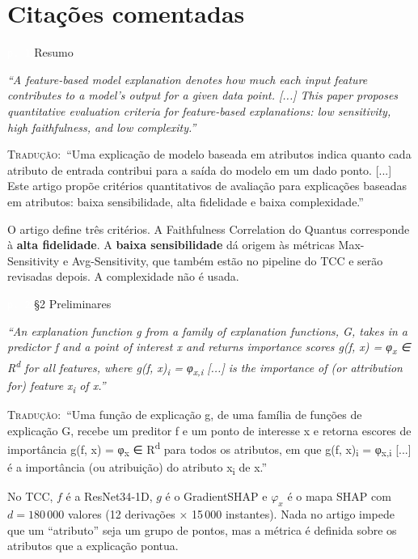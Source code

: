 \documentclass[11pt,a4paper]{article}
\newcommand{\pagechip}[1]{{\setlength{\fboxsep}{1.5pt}\colorbox{cAcc}{\textcolor{white}{\scriptsize\texttt{#1}}}}}
\newenvironment{origquote}{\par\itshape\small}{\par}
\newenvironment{tradquote}{\par\small\textsc{Tradução:}\ }{\par}
\newcommand{\explab}[1]{\par\smallskip{\small\color{cAcc}\textbf{\MakeUppercase{#1}}}\par}
\begin{document}
\section{Citações comentadas}

\begin{citacard}{\pagechip{p. 1} Resumo}
\begin{origquote}“A feature-based model explanation denotes how much each input feature contributes to a model’s output for a given data point. [...] This paper proposes quantitative evaluation criteria for feature-based explanations: low sensitivity, high faithfulness, and low complexity.”\end{origquote}
\begin{tradquote}“Uma explicação de modelo baseada em atributos indica quanto cada atributo de entrada contribui para a saída do modelo em um dado ponto. [...] Este artigo propõe critérios quantitativos de avaliação para explicações baseadas em atributos: baixa sensibilidade, alta fidelidade e baixa complexidade.”\end{tradquote}
\explab{Explicação}
O artigo define três critérios. A Faithfulness Correlation do Quantus corresponde à \textbf{alta fidelidade}. A \textbf{baixa sensibilidade} dá origem às métricas Max-Sensitivity e Avg-Sensitivity, que também estão no pipeline do TCC e serão revisadas depois. A complexidade não é usada.
\end{citacard}

\begin{citacard}{\pagechip{p. 2} §2 Preliminares}
\begin{origquote}“An explanation function g from a family of explanation functions, G, takes in a predictor f and a point of interest x and returns importance scores g(f, x) = φ\textsubscript{x} ∈ R\textsuperscript{d} for all features, where g(f, x)\textsubscript{i} = φ\textsubscript{x,i} [...] is the importance of (or attribution for) feature x\textsubscript{i} of x.”\end{origquote}
\begin{tradquote}“Uma função de explicação g, de uma família de funções de explicação G, recebe um preditor f e um ponto de interesse x e retorna escores de importância g(f, x) = φ\textsubscript{x} ∈ R\textsuperscript{d} para todos os atributos, em que g(f, x)\textsubscript{i} = φ\textsubscript{x,i} [...] é a importância (ou atribuição) do atributo x\textsubscript{i} de x.”\end{tradquote}
\explab{Explicação}
No TCC, $f$ é a ResNet34‑1D, $g$ é o GradientSHAP e $\varphi_x$ é o mapa SHAP com $d = 180\,000$ valores (12 derivações × 15\,000 instantes). Nada no artigo impede que um “atributo” seja um grupo de pontos, mas a métrica é definida sobre os atributos que a explicação pontua.
\end{citacard}
\end{document}
